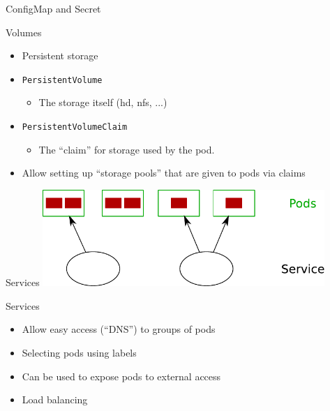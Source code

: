 \documentclass{dcpresentation}
\begin{document}
 
 \begin{frame}{ConfigMap and Secret}
  
 \end{frame}
 
 \begin{frame}{Volumes}
  \begin{itemize}
   \item Persistent storage
   \item \texttt{PersistentVolume}
   \begin{itemize}
    \item The storage itself (hd, nfs, ...)
   \end{itemize}
   \item \texttt{PersistentVolumeClaim}
   \begin{itemize}
    \item The ``claim'' for storage used by the pod.
   \end{itemize}
   \item Allow setting up ``storage pools'' that are given to pods via claims
  \end{itemize}
 \end{frame}

 \begin{frame}{Services}
  \centering
  \includegraphics[width=0.8\textwidth]{img/arch-ps.pdf}
 \end{frame}
 
 \begin{frame}{Services}
  \begin{itemize}
   \item Allow easy access (``DNS'') to groups of pods
   \item Selecting pods using labels
   \item Can be used to expose pods to external access
   \item Load balancing
  \end{itemize}
 \end{frame}
\end{document}
